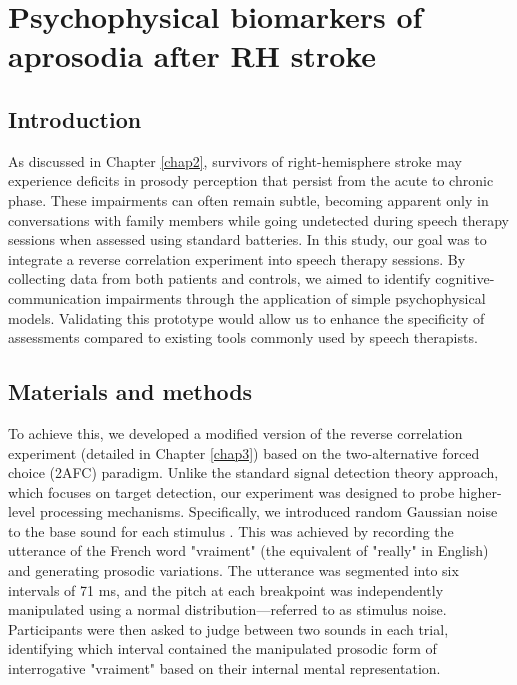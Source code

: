 \renewcommand{\chaptername}{Chapter} 
\chapter{Psychophysical biomarkers of aprosodia after RH stroke}\label{chap4}

\section{Introduction}
As discussed in Chapter \ref{chap2}, survivors of right-hemisphere stroke may experience deficits in prosody perception that persist from the acute to chronic phase. These impairments can often remain subtle, becoming apparent only in conversations with family members while going undetected during speech therapy sessions when assessed using standard batteries. In this study, our goal was to integrate a reverse correlation experiment into speech therapy sessions. By collecting data from both patients and controls, we aimed to identify cognitive-communication impairments through the application of simple psychophysical models. Validating this prototype would allow us to enhance the specificity of assessments compared to existing tools commonly used by speech therapists.

\section{Materials and methods}
To achieve this, we developed a modified version of the reverse correlation experiment (detailed in Chapter \ref{chap3}) based on the two-alternative forced choice (2AFC) paradigm. Unlike the standard signal detection theory approach, which focuses on target detection, our experiment was designed to probe higher-level processing mechanisms. Specifically, we introduced random Gaussian noise to the base sound for each stimulus \cite{burred_cleese_2019}. This was achieved by recording the utterance of the French word "vraiment" (the equivalent of "really" in English) and generating prosodic variations. The utterance was segmented into six intervals of 71 ms, and the pitch at each breakpoint was independently manipulated using a normal distribution—referred to as stimulus noise. Participants were then asked to judge between two sounds in each trial, identifying which interval contained the manipulated prosodic form of interrogative "vraiment" based on their internal mental representation.

